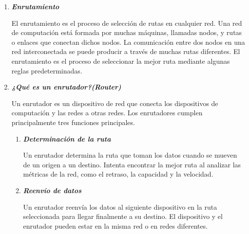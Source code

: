 \documentclass[12pt]{amsart}
\begin{document}
	\begin{enumerate}
		
		\thispagestyle{empty}
		
		\item \textbf{\textit{Enrutamiento}}
		
		\medskip
		\noindent El enrutamiento es el proceso de selección de rutas en cualquier red. Una red de computación está formada por muchas máquinas, llamadas nodos, y rutas o enlaces que conectan dichos nodos. La comunicación entre dos nodos en una red interconectada se puede producir a través de muchas rutas diferentes. El enrutamiento es el proceso de seleccionar la mejor ruta mediante algunas reglas predeterminadas.
		
		\bigskip\bigskip

		\item \textbf{\textit{¿Qué es un enrutador?(Router)}}
		
		\medskip
		\noindent Un enrutador es un dispositivo de red que conecta los dispositivos de computación y las redes a otras redes. Los enrutadores cumplen principalmente tres funciones principales.

			\begin{enumerate}
						\bigskip\bigskip

						\item \textbf{\textit{Determinación de la ruta}}
						
						\medskip
						\noindent Un enrutador determina la ruta que toman los datos cuando se mueven de un origen a un destino. Intenta encontrar la mejor ruta al analizar las métricas de la red, como el retraso, la capacidad y la velocidad.						
						\bigskip\bigskip

						\item \textbf{\textit{Reenvío de datos}}
						
						\medskip
						\noindent Un enrutador reenvía los datos al siguiente dispositivo en la ruta seleccionada para llegar finalmente a su destino. El dispositivo y el enrutador pueden estar en la misma red o en redes diferentes.
						\bigskip\bigskip


\end{enumerate}
\end{enumerate}
\end{document}
